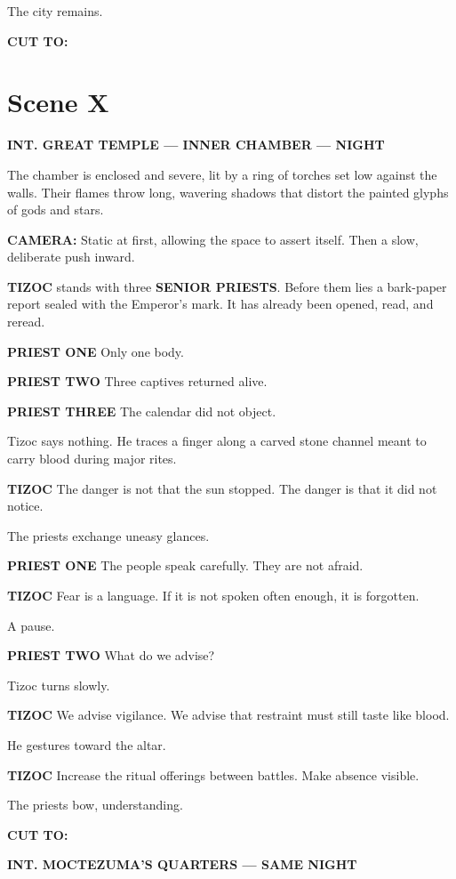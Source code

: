 \documentclass[12pt]{article}
\begin{document}
The city remains.

\textbf{CUT TO:}

\section*{Scene X}

\textbf{INT. GREAT TEMPLE — INNER CHAMBER — NIGHT}

The chamber is enclosed and severe, lit by a ring of torches set low against the walls. Their flames throw long, wavering shadows that distort the painted glyphs of gods and stars.

\textbf{CAMERA:} Static at first, allowing the space to assert itself. Then a slow, deliberate push inward.

\textbf{TIZOC} stands with three \textbf{SENIOR PRIESTS}. Before them lies a bark-paper report sealed with the Emperor’s mark. It has already been opened, read, and reread.

\textbf{PRIEST ONE}  
Only one body.

\textbf{PRIEST TWO}  
Three captives returned alive.

\textbf{PRIEST THREE}  
The calendar did not object.

Tizoc says nothing. He traces a finger along a carved stone channel meant to carry blood during major rites.

\textbf{TIZOC}  
The danger is not that the sun stopped.  
The danger is that it did not notice.

The priests exchange uneasy glances.

\textbf{PRIEST ONE}  
The people speak carefully.  
They are not afraid.

\textbf{TIZOC}  
Fear is a language.  
If it is not spoken often enough,  
it is forgotten.

A pause.

\textbf{PRIEST TWO}  
What do we advise?

Tizoc turns slowly.

\textbf{TIZOC}  
We advise vigilance.  
We advise that restraint must still taste like blood.

He gestures toward the altar.

\textbf{TIZOC}  
Increase the ritual offerings between battles.  
Make absence visible.

The priests bow, understanding.

\textbf{CUT TO:}

\textbf{INT. MOCTEZUMA’S QUARTERS — SAME NIGHT}
\end{document}
